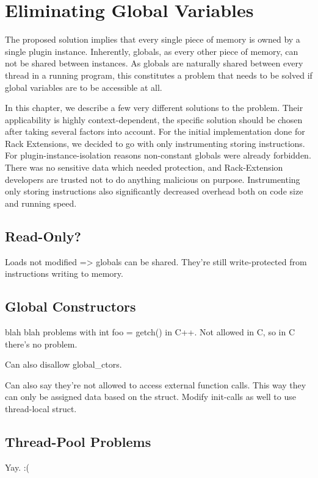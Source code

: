\chapter {Eliminating Global Variables}

The proposed solution implies that every single piece of memory is owned by a
single plugin instance. Inherently, globals, as every other piece of memory, can
not be shared between instances. As globals are naturally shared between every
thread in a running program, this constitutes a problem that needs to be solved
if global variables are to be accessible at all.

In this chapter, we describe a few very different solutions to the problem.
Their applicability is highly context-dependent, the specific solution should be
chosen after taking several factors into account. For the initial implementation
done for Rack Extensions, we decided to go with only instrumenting storing
instructions. For plugin-instance-isolation reasons non-constant globals were
already forbidden. There was no sensitive data which needed protection, and
Rack-Extension developers are trusted not to do anything malicious on purpose.
Instrumenting only storing instructions also significantly decreased overhead
both on code size and running speed.


\section {Read-Only?}

Loads not modified => globals can be shared. They're still write-protected from
instructions writing to memory.


\section {Global Constructors}

blah blah problems with int foo = getch() in C++. Not allowed in C, so in C
there's no problem.

Can also disallow global\_ctors.

Can also say they're not allowed to access external function calls. This way
they can only be assigned data based on the struct. Modify init-calls as well
to use thread-local struct.


\section {Thread-Pool Problems}

Yay. :(

